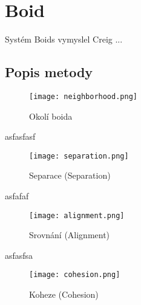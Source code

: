 \section{Boid}
Systém Boids vymyslel Creig ...
\subsection{Popis metody}

\begin{figure}[H]
	\texttt{[image: neighborhood.png]}
	\centering
	\caption{Okolí boida}
\end{figure}

asfasfasf

\begin{figure}[H]
	\texttt{[image: separation.png]}
	\centering
	\caption{Separace (Separation)}
\end{figure}

asfafaf

\begin{figure}[H]
	\texttt{[image: alignment.png]}
	\centering
	\caption{Srovnání (Alignment)}
\end{figure}

asfasfsa

\begin{figure}[H]
	\texttt{[image: cohesion.png]}
	\centering
	\caption{Koheze (Cohesion)}
\end{figure}